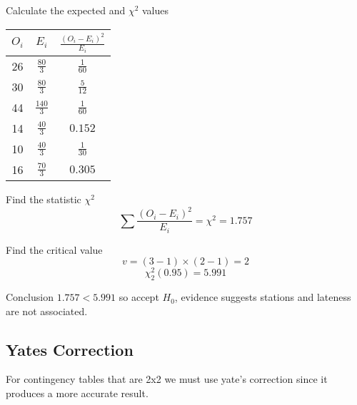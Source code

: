 \begin{example}
        \begin{step}{Calculate the expected and $\chi^2$ values}
        \begin{center}
        \begin{tabular}{c|c|c}
            $O_i$ & $E_i$           & $\displaystyle\frac{(O_i - E_i)^2}{E_i}$   \\[2ex]
            \hline
            \rule{0pt}{3.5ex} 
            26    & $\frac{80}{3}$  & $\frac{1}{60}$                \\[1ex]
            30    & $\frac{80}{3}$  & $\frac{5}{12}$                \\[1ex]
            44    & $\frac{140}{3}$ & $\frac{1}{60}$                \\[1ex]
            14    & $\frac{40}{3}$  & $0.152$                       \\[1ex]
            10    & $\frac{40}{3}$  & $\frac{1}{30}$                \\[1ex]
            16    & $\frac{70}{3}$  & $0.305$                       \\[1ex]
        \end{tabular}
        \end{center}
        \end{step}
    
        \begin{step}{Find the statistic $\chi^2$}
        $$\sum{\frac{(O_i - E_i)^2}{E_i}} = \chi^2 = 1.757$$
        \end{step}
        
        \begin{step}{Find the critical value}
        $$v = (3-1)\times(2-1) = 2$$
        $$\chi^2_2(0.95) = 5.991$$
        \end{step}
        
        \begin{step}{Conclusion}
        $1.757 < 5.991$ so accept $H_0$, evidence suggests stations and lateness are not associated.
        \end{step}
        
        \end{example}
    
    \newpage
    \subsection{Yates Correction}
        For contingency tables that are 2x2 we must use yate's correction since it produces a more accurate result.
        
